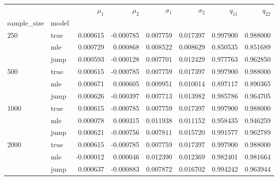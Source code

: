 \begin{tabular}{llrrrrrr}
\toprule
     &      &   $\mu_1$ &   $\mu_2$ &  $\sigma_1$ &  $\sigma_2$ &    $q_11$ &    $q_22$ \\
sample_size & model &           &           &             &             &           &           \\
\midrule
250  & true &  0.000615 & -0.000785 &    0.007759 &    0.017397 &  0.997900 &  0.988000 \\
     & mle &  0.000729 &  0.000868 &    0.008522 &    0.008629 &  0.850535 &  0.851689 \\
     & jump &  0.000593 & -0.000128 &    0.007701 &    0.012429 &  0.977763 &  0.962850 \\
500  & true &  0.000615 & -0.000785 &    0.007759 &    0.017397 &  0.997900 &  0.988000 \\
     & mle &  0.000671 &  0.000605 &    0.009951 &    0.010014 &  0.897117 &  0.890365 \\
     & jump &  0.000626 & -0.000397 &    0.007713 &    0.013982 &  0.985786 &  0.964705 \\
1000 & true &  0.000615 & -0.000785 &    0.007759 &    0.017397 &  0.997900 &  0.988000 \\
     & mle &  0.000078 &  0.000315 &    0.011938 &    0.011152 &  0.958435 &  0.946259 \\
     & jump &  0.000621 & -0.000756 &    0.007811 &    0.015720 &  0.991577 &  0.962789 \\
2000 & true &  0.000615 & -0.000785 &    0.007759 &    0.017397 &  0.997900 &  0.988000 \\
     & mle & -0.000012 &  0.000046 &    0.012390 &    0.012369 &  0.982401 &  0.981664 \\
     & jump &  0.000637 & -0.000883 &    0.007872 &    0.016702 &  0.994242 &  0.963944 \\
\bottomrule
\end{tabular}

